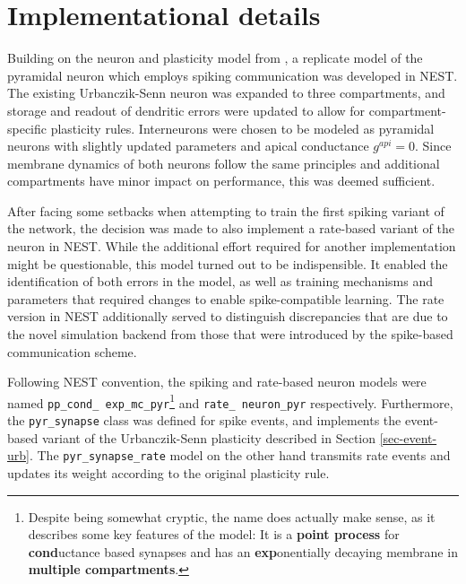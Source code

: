 \section{Implementational details}

Building on the neuron and plasticity model from \cite{Stapmanns2021}, a replicate model of the pyramidal neuron which
employs spiking communication was developed in NEST. The existing Urbanczik-Senn neuron was expanded to three
compartments, and storage and readout of dendritic errors were updated  to allow for compartment-specific plasticity
rules. Interneurons were chosen to be modeled as pyramidal neurons with slightly updated parameters and apical
conductance $g^{api}=0$. Since membrane dynamics of both neurons follow the same principles and additional compartments
have minor impact on performance, this was deemed sufficient.

After facing some setbacks when attempting to train the first spiking variant of the network, the decision was made to
also implement a rate-based variant of the neuron in NEST.  While the additional effort required for another
implementation might be questionable, this model turned out to be indispensible. It enabled the identification of both
errors in the model, as well as training mechanisms and parameters that required changes to enable spike-compatible
learning. The rate version in NEST additionally served to distinguish discrepancies that are due to the novel simulation
backend from those that were introduced by the spike-based communication scheme.

Following NEST convention, the spiking and rate-based neuron models were named \texttt{pp\_\allowbreak cond\_\allowbreak
exp\_\allowbreak mc\_\allowbreak pyr}\footnote{Despite being somewhat cryptic, the name does actually make sense, as it
describes some key features of the model: It is a \textbf{point process} for \textbf{cond}uctance based synapses and has
an \textbf{exp}onentially decaying membrane in \textbf{multiple compartments}.} and \texttt{rate\_\allowbreak
neuron\_\allowbreak pyr} respectively. Furthermore, the \texttt{pyr\_\allowbreak synapse} class was defined for spike
events, and implements the event-based variant of the Urbanczik-Senn plasticity described in Section
\ref{sec-event-urb}. The \texttt{pyr\_\allowbreak synapse\_\allowbreak rate} model on the other hand transmits rate
events and updates its weight according to the original plasticity rule.


